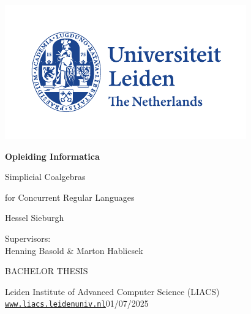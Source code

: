 \thispagestyle{empty}

\includegraphics{logoleiden}

\vspace{-2.5cm}\hfill \begin{huge}\textbf{Opleiding Informatica}\end{huge}

\vspace{5cm}
\begin{Large}
\hfill Simplicial Coalgebras

\vspace*{3mm}

\hfill for Concurrent Regular Languages

\vspace*{14mm}

\hfill Hessel Sieburgh
\end{Large}

\vspace*{6.0cm}

\begin{large}

Supervisors:\\
Henning Basold \& 
Marton Hablicsek


\vspace*{1.8cm}
BACHELOR THESIS

\vspace*{5mm}
Leiden Institute of Advanced Computer Science (LIACS)\\
\href{www.liacs.leidenuniv.nl}{\underline{\texttt{www.liacs.leidenuniv.nl}}}\hfill 01/07/2025
\end{large}

\newpage